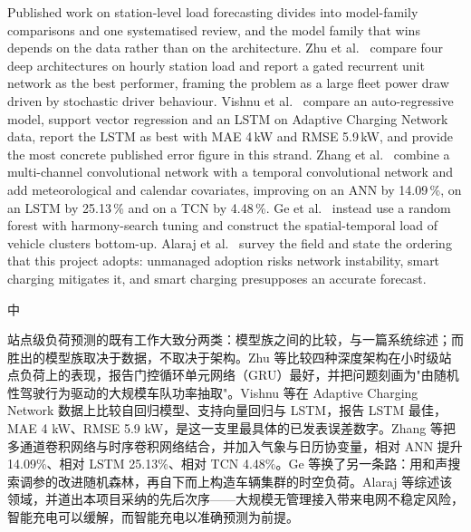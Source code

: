 \documentclass[10pt,a4paper]{article}
\newenvironment{zh}{%
  \par\vspace{1pt}%
  \begingroup
  \color{black!72}\small
  \setlength{\parskip}{0pt}%
  \noindent\textsf{\footnotesize 中}\hspace{3pt}\ignorespaces
}{%
  \par\endgroup\vspace{4pt}%
}
\begin{document}
Published work on station-level load forecasting divides into model-family comparisons and one
systematised review, and the model family that wins depends on the data rather than on the
architecture. Zhu et al.~\cite{Zhu2019ShortTermEVLoadDL} compare four deep architectures on hourly
station load and report a gated recurrent unit network as the best performer, framing the problem
as a large fleet power draw driven by stochastic driver behaviour.
Vishnu et al.~\cite{Vishnu2023ShortTermEVLoadTSMLDL} compare an auto-regressive model, support
vector regression and an LSTM on Adaptive Charging Network data, report the LSTM as best with
MAE 4\,kW and RMSE 5.9\,kW, and provide the most concrete published error figure in this strand.
Zhang et al.~\cite{Zhang2022MCCNNTCN} combine a multi-channel convolutional network with a temporal
convolutional network and add meteorological and calendar covariates, improving on an ANN by
14.09\,\%, on an LSTM by 25.13\,\% and on a TCN by 4.48\,\%. Ge et
al.~\cite{Ge2020SpatialTemporalEVLoadProfile} instead use a random forest with harmony-search
tuning and construct the spatial-temporal load of vehicle clusters bottom-up.
Alaraj et al.~\cite{Alaraj2025MLChargingDemandReview} survey the field and state the ordering that
this project adopts: unmanaged adoption risks network instability, smart charging mitigates it, and
smart charging presupposes an accurate forecast.

\begin{zh}
站点级负荷预测的既有工作大致分两类：模型族之间的比较，与一篇系统综述；而胜出的模型族取决于数据，不取决于架构。Zhu 等比较四种深度架构在小时级站点负荷上的表现，报告门控循环单元网络（GRU）最好，并把问题刻画为"由随机性驾驶行为驱动的大规模车队功率抽取"。Vishnu 等在 Adaptive Charging Network 数据上比较自回归模型、支持向量回归与 LSTM，报告 LSTM 最佳，MAE 4 kW、RMSE 5.9 kW，是这一支里最具体的已发表误差数字。Zhang 等把多通道卷积网络与时序卷积网络结合，并加入气象与日历协变量，相对 ANN 提升 14.09\%、相对 LSTM 25.13\%、相对 TCN 4.48\%。Ge 等换了另一条路：用和声搜索调参的改进随机森林，再自下而上构造车辆集群的时空负荷。Alaraj 等综述该领域，并道出本项目采纳的先后次序——大规模无管理接入带来电网不稳定风险，智能充电可以缓解，而智能充电以准确预测为前提。
\end{zh}
\end{document}
